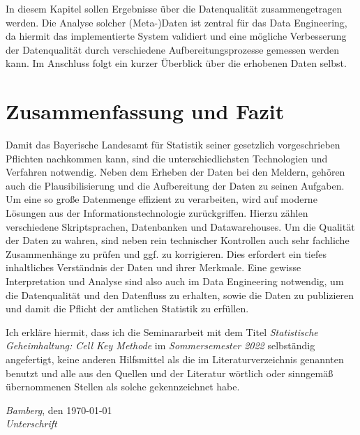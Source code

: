 In diesem Kapitel sollen Ergebnisse über die Datenqualität zusammengetragen werden. Die Analyse solcher (Meta-)Daten ist zentral für das Data Engineering, da hiermit das implementierte System validiert und eine mögliche Verbesserung der Datenqualität durch verschiedene Aufbereitungsprozesse gemessen werden kann. Im Anschluss folgt ein kurzer Überblick über die erhobenen Daten selbst.



\section{Zusammenfassung und Fazit}

Damit das Bayerische Landesamt für Statistik seiner gesetzlich vorgeschrieben Pflichten nachkommen kann, sind die unterschiedlichsten Technologien und Verfahren notwendig. Neben dem Erheben der Daten bei den Meldern, gehören auch die Plausibilisierung und die Aufbereitung der Daten zu seinen Aufgaben. Um eine so große Datenmenge effizient zu verarbeiten, wird auf moderne Lösungen aus der Informationstechnologie zurückgriffen. Hierzu zählen verschiedene Skriptsprachen, Datenbanken und Datawarehouses. Um die Qualität der Daten zu wahren, sind neben rein technischer Kontrollen auch sehr fachliche Zusammenhänge zu prüfen und ggf. zu korrigieren. Dies erfordert ein tiefes inhaltliches Verständnis der Daten und ihrer Merkmale. Eine gewisse Interpretation und Analyse sind also auch im Data Engineering notwendig, um die Datenqualität und den Datenfluss zu erhalten, sowie die Daten zu publizieren und damit die Pflicht der amtlichen Statistik zu erfüllen. 


\newpage%

%




\noindent%
Ich erkläre hiermit, dass ich die Seminararbeit mit dem Titel \emph{Statistische Geheimhaltung: Cell Key Methode} im \emph{Sommersemester 2022} selbständig angefertigt, keine anderen Hilfsmittel als die im Literaturverzeichnis genannten benutzt und alle aus den Quellen und der Literatur wörtlich oder sinngemäß übernommenen Stellen als solche gekennzeichnet habe.%
\bigskip
 
\noindent%
\emph{Bamberg}, den \today\\%
\emph{Unterschrift}%

%


